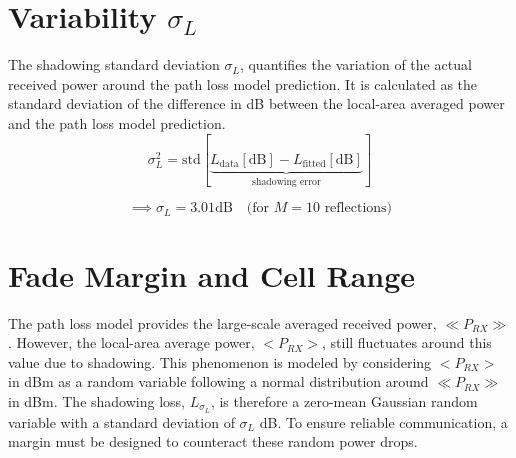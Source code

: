 \section{Variability $\sigma_L$}
The shadowing standard deviation $\sigma_L$, quantifies the variation of the actual received power around the path loss model prediction. It is calculated as the standard deviation of the difference in dB between the local-area averaged power and the path loss model prediction.
\begin{equation}
	\sigma_L^2 = \mathrm{std} \left[ 
	\underbrace{L_{\mathrm{data}}[\mathrm{dB}] - L_{\mathrm{fitted}}[\mathrm{dB}]}_{\text{shadowing error}}
	\right]
\end{equation}

\begin{equation}
	\implies \boxed{\sigma_L = 3.01 \mathrm{dB}} \quad \text{(for $M = 10$ reflections)}
\end{equation}


\section{Fade Margin and Cell Range}
The path loss model provides the large-scale averaged received power, $\ll P_{RX} \gg$. However, the local-area average power, $<P_{RX}>$, still fluctuates around this value due to shadowing. This phenomenon is modeled by considering $<P_{RX}>$ in dBm as a random variable following a normal distribution around $\ll P_{RX} \gg$ in dBm. The shadowing loss, $L_{\sigma_L}$, is therefore a zero-mean Gaussian random variable with a standard deviation of $\sigma_L$ dB. To ensure reliable communication, a margin must be designed to counteract these random power drops.

